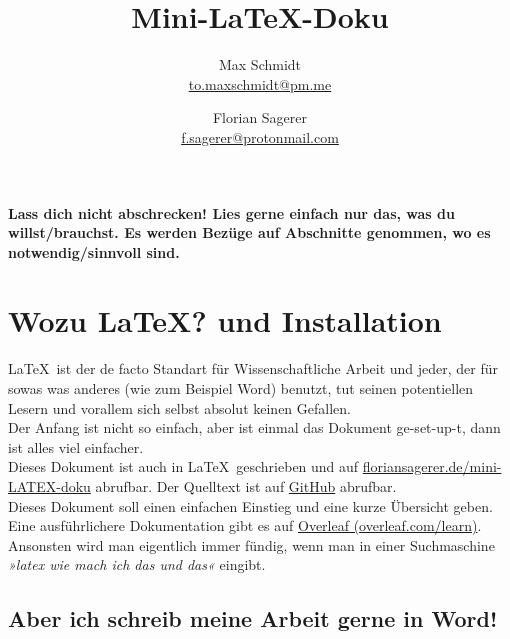 \documentclass{article}
\begin{document}
\title{Mini-\LaTeX-Doku}
\author{Max Schmidt \\ \href{mailto:to.maxschmidt@pm.me}{to.maxschmidt@pm.me}
   \and Florian Sagerer \\ \href{mailto:f.sagerer@protonmail.com}{f.sagerer@protonmail.com} }

\maketitle
\thispagestyle{empty}

\tableofcontents
\thispagestyle{empty}
\newpage

{\setlength{\parindent}{0cm}
\large{\textbf{Lass dich nicht abschrecken! Lies gerne einfach nur das, was du willst/brauchst. Es werden Bezüge auf Abschnitte genommen, wo es notwendig/sinnvoll sind.}}
}





\section{Wozu \LaTeX? und Installation}


\LaTeX\ ist der de facto Standart für Wissenschaftliche Arbeit und jeder, der für sowas was anderes (wie zum Beispiel Word) benutzt, tut seinen potentiellen Lesern und vorallem sich selbst absolut keinen Gefallen. \\
Der Anfang ist nicht so einfach, aber ist einmal das Dokument ge-set-up-t, dann ist alles viel einfacher. \\

Dieses Dokument ist auch in \LaTeX\ geschrieben und auf \href{https://floriansagerer.de/mini-LATEX-doku/}{floriansagerer.de/mini-LATEX-doku} abrufbar. 
Der Quelltext ist auf \href{https://github.com/QrxLP/mini-LATEX-doku}{GitHub} abrufbar.\\

Dieses Dokument soll einen einfachen Einstieg und eine kurze Übersicht geben.
Eine ausführlichere Dokumentation gibt es auf \href{https://www.overleaf.com/learn}{Overleaf (overleaf.com/learn)}. Ansonsten wird man eigentlich immer fündig, wenn man in einer Suchmaschine \textit{»latex wie mach ich das und das«} eingibt.


\subsection{Aber ich schreib meine Arbeit gerne in Word!}
\end{document}
